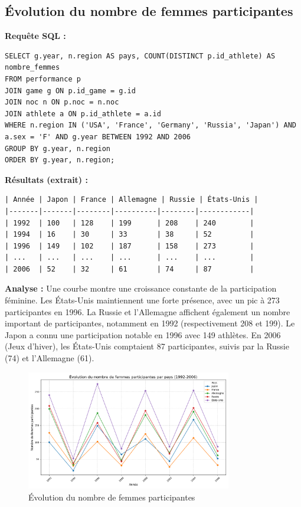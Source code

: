 \documentclass[fontsize=10pt,oneside]{scrreprt}
\begin{document}
\subsection{Évolution du nombre de femmes participantes}
\textbf{Requête SQL :}
\begin{verbatim}
SELECT g.year, n.region AS pays, COUNT(DISTINCT p.id_athlete) AS nombre_femmes
FROM performance p
JOIN game g ON p.id_game = g.id
JOIN noc n ON p.noc = n.noc
JOIN athlete a ON p.id_athlete = a.id
WHERE n.region IN ('USA', 'France', 'Germany', 'Russia', 'Japan') AND a.sex = 'F' AND g.year BETWEEN 1992 AND 2006
GROUP BY g.year, n.region
ORDER BY g.year, n.region;
\end{verbatim}
\textbf{Résultats (extrait) :}
\begin{verbatim}
| Année | Japon | France | Allemagne | Russie | États-Unis |
|-------|-------|--------|----------|--------|------------|
| 1992  | 100   | 128    | 199      | 208    | 240        |
| 1994  | 16    | 30     | 33       | 38     | 52         |
| 1996  | 149   | 102    | 187      | 158    | 273        |
| ...   | ...   | ...    | ...      | ...    | ...        |
| 2006  | 52    | 32     | 61       | 74     | 87         |
\end{verbatim}
\textbf{Analyse :} Une courbe montre une croissance constante de la participation féminine. Les États-Unis maintiennent une forte présence, avec un pic à 273 participantes en 1996. La Russie et l'Allemagne affichent également un nombre important de participantes, notamment en 1992 (respectivement 208 et 199). Le Japon a connu une participation notable en 1996 avec 149 athlètes. En 2006 (Jeux d'hiver), les États-Unis comptaient 87 participantes, suivis par la Russie (74) et l'Allemagne (61).
\begin{figure}[H]
    \centering
    \includegraphics[width=0.8\textwidth]{charts/3biii.png}
    \caption{Évolution du nombre de femmes participantes}
    \label{fig:evol_femmes_participantes}
\end{figure}
\end{document}
